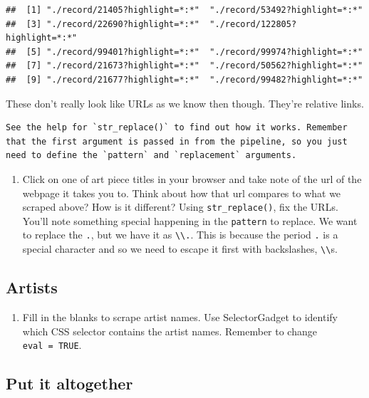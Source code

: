 \documentclass[
]{article}
\providecommand{\tightlist}{%
  \setlength{\itemsep}{0pt}\setlength{\parskip}{0pt}}
\begin{document}
\begin{verbatim}
##  [1] "./record/21405?highlight=*:*"  "./record/53492?highlight=*:*" 
##  [3] "./record/22690?highlight=*:*"  "./record/122805?highlight=*:*"
##  [5] "./record/99401?highlight=*:*"  "./record/99974?highlight=*:*" 
##  [7] "./record/21673?highlight=*:*"  "./record/50562?highlight=*:*" 
##  [9] "./record/21677?highlight=*:*"  "./record/99482?highlight=*:*"
\end{verbatim}

These don't really look like URLs as we know then though. They're
relative links.

\begin{verbatim}
See the help for `str_replace()` to find out how it works. Remember that the first argument is passed in from the pipeline, so you just need to define the `pattern` and `replacement` arguments.
\end{verbatim}

\begin{enumerate}
\def\labelenumi{\arabic{enumi}.}
\tightlist
\item
  Click on one of art piece titles in your browser and take note of the
  url of the webpage it takes you to. Think about how that url compares
  to what we scraped above? How is it different? Using
  \texttt{str\_replace()}, fix the URLs. You'll note something special
  happening in the \texttt{pattern} to replace. We want to replace the
  \texttt{.}, but we have it as
  \texttt{\textbackslash{}\textbackslash{}.}. This is because the period
  \texttt{.} is a special character and so we need to escape it first
  with backslashes, \texttt{\textbackslash{}\textbackslash{}}s.
\end{enumerate}

\subsection{Artists}\label{artists}

\begin{enumerate}
\def\labelenumi{\arabic{enumi}.}
\setcounter{enumi}{1}
\tightlist
\item
  Fill in the blanks to scrape artist names. Use SelectorGadget to
  identify which CSS selector contains the artist names. Remember to
  change \texttt{eval\ =\ TRUE}.
\end{enumerate}

\subsection{Put it altogether}\label{put-it-altogether}
\end{document}

